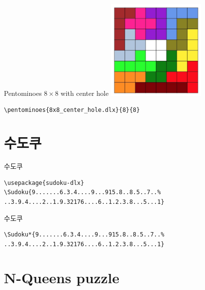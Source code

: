 \documentclass{beamer}
\begin{document}
%
\begin{frame}[fragile]{Pentominoes $8\times8$ with center hole}
\centering\includegraphics[height=5cm]{8x8.jpg}
\begin{verbatim}
\pentominoes{8x8_center_hole.dlx}{8}{8}
\end{verbatim}  
\end{frame}

\section{수도쿠}

%
\begin{frame}[fragile]{수도쿠}
\begin{verbatim}
\usepackage{sudoku-dlx}
\Sudoku{9.......6.3.4....9...915.8..8.5..7..%
..3.9.4....2..1.9.32176....6..1.2.3.8...5...1}
\end{verbatim}  

\begin{center}
\end{center}
\end{frame}

%
\begin{frame}[fragile]{수도쿠}
\begin{verbatim}
\Sudoku*{9.......6.3.4....9...915.8..8.5..7..%
..3.9.4....2..1.9.32176....6..1.2.3.8...5...1}
\end{verbatim}

\begin{center}
\end{center}
\end{frame}

\section{N-Queens puzzle}
\end{document}
